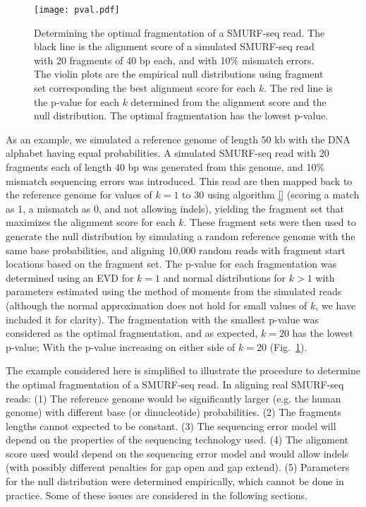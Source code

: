 \begin{figure}[t!]
\centering
\texttt{[image: pval.pdf]}
\caption[Determining the optimal fragmentation of a SMURF-seq read]{
  Determining the optimal fragmentation of a SMURF-seq read. The black
  line is the alignment score of a simulated SMURF-seq read with 20
  fragments of 40 bp each, and with 10\% mismatch errors. The violin plots
  are the empirical null distributions using fragment set corresponding
  the best alignment score for each $k$. The red line is the p-value for
  each $k$ determined from the alignment score and the null distribution.
  The optimal fragmentation has the lowest p-value.}
\label{pval_calc}
\end{figure}

As an example, we simulated a reference genome of length 50 kb with the
DNA alphabet having equal probabilities.
%
A simulated SMURF-seq read with 20 fragments each of length 40 bp was
generated from this genome, and 10\% mismatch sequencing errors was
introduced.
%
This read are then mapped back to the reference genome for values of $k
= 1$ to $30$ using algorithm \ref{} (scoring a match as 1, a mismatch as
0, and not allowing indels), yielding the fragment set that maximizes
the alignment score for each $k$.
%
These fragment sets were then used to generate the null distribution by
simulating a random reference genome with the same base probabilities,
and aligning 10,000 random reads with fragment start locations based on
the fragment set.
%
The p-value for each fragmentation was determined using an EVD for $k=1$
and normal distributions for $k > 1$ with parameters estimated using the
method of moments from the simulated reads (although the normal
approximation does not hold for small values of $k$, we have included it
for clarity).
%
The fragmentation with the smallest p-value was considered as the
optimal fragmentation, and as expected, $k = 20$ has the lowest p-value;
With the p-value increasing on either side of $k = 20$
(Fig.~\ref{pval_calc}).

The example considered here is simplified to illustrate the procedure
to determine the optimal fragmentation of a SMURF-seq read. In aligning
real SMURF-seq reads: (1) The reference genome would be significantly
larger (e.g. the human genome) with different base (or dinucleotide)
probabilities. (2) The fragments lengths cannot expected to be constant.
(3) The sequencing error model will depend on the properties of the
sequencing technology used. (4) The alignment score used would depend on
the sequencing error model and would allow indels (with possibly
different penalties for gap open and gap extend). (5) Parameters for the
null distribution were determined empirically, which cannot be done in
practice. Some of these issues are considered in the following sections.

